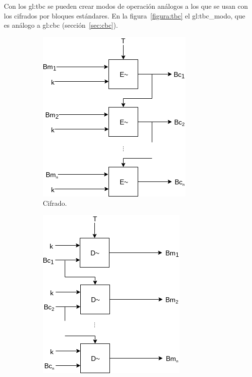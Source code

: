 
Con los \gls{gl:tbc} se pueden crear modos de operación análogos a los que se
usan con los cifrados por bloques estándares. En la figura~\ref{figura:tbc}
el \gls{gl:tbc_modo}, que es análogo a \gls{gl:cbc} (sección~\ref{sec:cbc}).

\begin{figure}
  \centering
  \begin{subfigure}{0.45\textwidth}
    \begin{center}
      \includegraphics[width=0.7\linewidth]{diagramas/tbc.png}
      \caption{Cifrado.}
    \end{center}
  \end{subfigure}
  \begin{subfigure}{0.45\textwidth}
    \begin{center}
      \includegraphics[width=0.7\linewidth]{diagramas/tbc_inverso.png}

\end{center}
\end{subfigure}
\end{figure}
